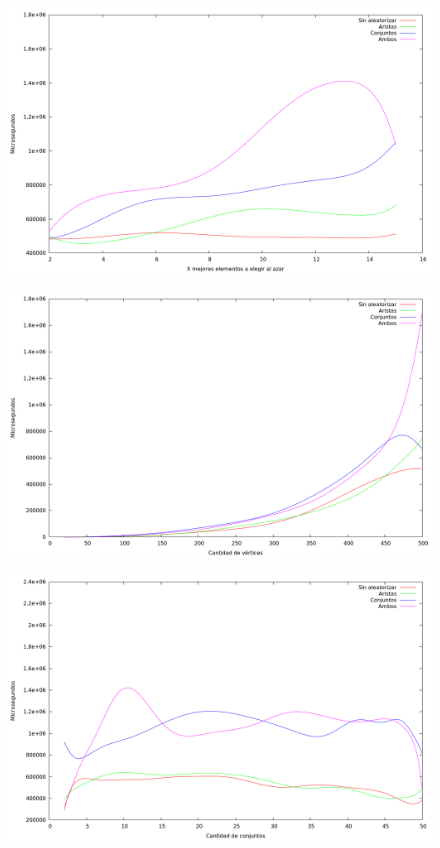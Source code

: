 \begin{figure}[H]
  \begin{center}
    \includegraphics[scale=0.35]{imagenes/grasp-local-x-tiempo.png}
  \end{center}
\end{figure}

\begin{figure}[H]
  \begin{center}
    \includegraphics[scale=0.35]{imagenes/grasp-local-n-tiempo.png}
  \end{center}
\end{figure}

\begin{figure}[H]
  \begin{center}
    \includegraphics[scale=0.35]{imagenes/grasp-local-k-tiempo.png}
  \end{center}
\end{figure}

